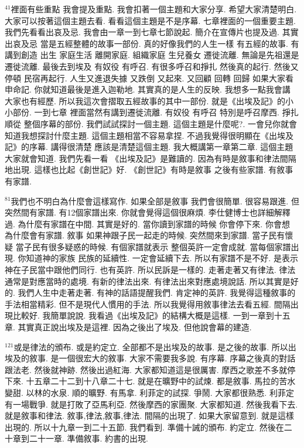 \documentclass{book}
\begin{document}
$^{41}$裡面有些重點 我會提及重點.
我會扣著一個主題和大家分享.
希望大家清楚明白.
大家可以按著這個主題去看.
看看這個主題是不是序幕.
七章裡面的一個重要主題.
我們先看看出哀及忌.
我會由一章一到七章七節說起.
簡介在宣傳片也提及過.
其實出哀及忌 當是五經整體的故事一部份.
真的好像我們的人生一樣 有五經的故事.
有講到創造 出生 家庭生活 離開家庭.
組織家庭 生兒養女 遷徙流離.
無論是先祖還是遷徙流離.
最後去到埃及 有奴役 有呼召.
有很多呼召和掙扎 然後真的起行.
然後又停頓 民宿再起行.
人生又進退失據 又跌倒 又起來.
又回顧 回轉 回歸 如果大家看申命記.
你就知道最後是進入迦勒地.
其實真的是人生的反映.
我想多一點我會講 大家也有經歷.
所以我這次會摺取五經故事的其中一部份.
就是《出埃及記》的小小部份.
一到七章 裡面當然有講到遷徙流離.
有奴役 有呼召 特別是呼召摩西.
掙扎 順從 整個序幕的部份.
我們試試探討一個主題.
這個主題是什麼呢?.
一會兒你就會知道我想探討什麼主題.
這個主題相當不容易拿捏.
不過我覺得很明顯在《出埃及記》的序幕.
講得很清楚 應該是清楚這個主題.
我大概講第一章第二章.
這個主題大家就會知道.
我們先看一看 《出埃及記》是難讀的.
因為有時是敘事和律法間隔地出現.
這樣也比起《創世記》好.
《創世記》有時是敘事 之後有些家譜.
有敘事 有家譜.

$^{81}$我們也不明白為什麼會這樣寫作.
如果全部是敘事 我們會很簡單.
很容易跟進.
但突然間有家譜.
有12個家譜出來.
你就會覺得這個很麻煩.
李仕健博士也詳細解釋過.
為什麼有家譜在中間.
其實是好的.
當你讀到家譜的時候 你會停下來.
你會想 為什麼會有家譜.
敘事 如果神跟子民一起走的時候.
突然間來到家譜.
當子民有懷疑 當子民有很多疑惑的時候.
有個家譜就表示 整個英許一定會成就.
當每個家譜出現.
你知道神的家族 民族的延續性.
一定會延續下去.
所以有家譜不是不好.
是表示神在子民當中跟他們同行.
也有英許.
所以民訴是一樣的.
走著走著又有律法.
律法通常是對應當時的處境.
有新的律法出來.
有律法出來對應處境說話.
所以其實是好的.
我們人生中走著走著.
有神的話語提醒我們.
肯定神的英許.
我覺得這種敘事的手法相當精彩.
但不是現代人慣用的手法.
所以我覺得用敘事律法去看五經.
間隔出現比較好.
我簡單說說.
我看過《出埃及記》的結構大概是這樣.
一到一章到十五章.
其實真正說出埃及是這裡.
因為之後出了埃及.
但他說會幕的建造.

$^{121}$或是律法的頒布.
或是約定立.
全部都不是出埃及的故事.
是之後的故事.
所以出埃及的敘事.
是一個很宏大的敘事.
大家不需要我多說.
有序幕.
序幕之後真的對話跟法老.
然後就神跡.
然後出過紅海.
大家都知道這是很厲害.
摩西之歌差不多就停下來.
十五章二十二到十八章二十七.
就是在曠野中的試煉.
都是敘事.
馬拉的苦水變甜.
以林的水泉.
順的曠野.
有馬拿.
利菲定的試探.
爭鬧.
大家都很熟悉.
利菲定有一場戰爭.
就是打敗了亞馬利亞.
然後摩西的家團聚.
大家都知道.
然後我看下去.
就是敘事和律法.
敘事,律法,敘事,律法.
間隔的出現了.
如果大家留意到.
就是這樣出現的.
所以十九章一到二十五節.
我們看到.
準備十誡的頒布.
約定立.
然後在二十章到二十一章.
準備敘事.
約書的出現.
\end{document}
